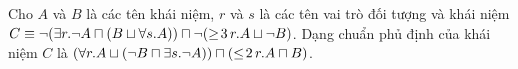 \begin{Example}
	Cho $A$ và $B$ là các tên khái niệm, $r$ và $s$ là các tên vai trò đối tượng và khái niệm $C \equiv \neg (\exists r.\neg A \sqcap (B \sqcup \forall s.A)) \sqcap \neg (\geq\!3\,r.A \sqcup \neg B)$. Dạng chuẩn phủ định của khái niệm $C$ là $(\forall r.A \sqcup (\neg B \sqcap \exists s.\neg A)) \sqcap (\leq\!2\,r.A \sqcap B)$.\myend
\end{Example}

